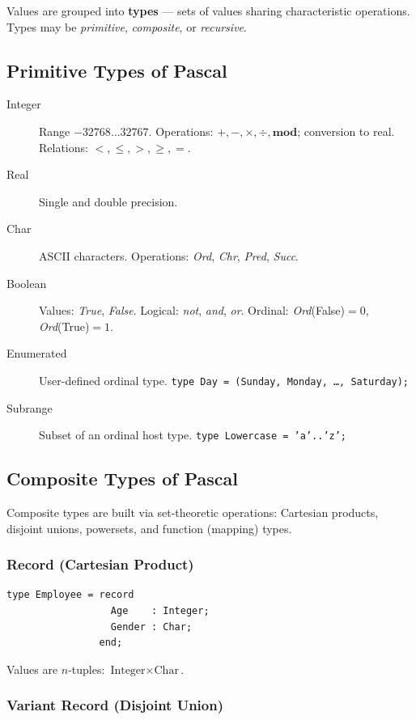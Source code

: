 \documentclass[12pt,a4paper]{article}
\begin{document}
Values are grouped into \textbf{types} — sets of values sharing characteristic operations.
Types may be \emph{primitive}, \emph{composite}, or \emph{recursive}.

\subsection{Primitive Types of Pascal}

\begin{description}
  \item[Integer] Range $-32768 \ldots 32767$.
        Operations: $+,-,\times,\div,\mathbf{mod}$; conversion to real.
        Relations: $<,\leq,>,\geq,=$.
  \item[Real] Single and double precision.
  \item[Char] ASCII characters. Operations: \textit{Ord}, \textit{Chr}, \textit{Pred}, \textit{Succ}.
  \item[Boolean] Values: \textit{True}, \textit{False}.
        Logical: \textit{not}, \textit{and}, \textit{or}.
        Ordinal: \textit{Ord}(False)$=0$, \textit{Ord}(True)$=1$.
  \item[Enumerated] User-defined ordinal type.
        \texttt{type Day = (Sunday, Monday, \ldots, Saturday);}
  \item[Subrange] Subset of an ordinal host type.
        \texttt{type Lowercase = 'a'..'z';}
\end{description}

\subsection{Composite Types of Pascal}

Composite types are built via set-theoretic operations:
Cartesian products, disjoint unions, powersets, and function (mapping) types.

\subsubsection{Record (Cartesian Product)}

\begin{lstlisting}[style=pascal,numbers=none]
type Employee = record
                  Age    : Integer;
                  Gender : Char;
                end;
\end{lstlisting}
Values are $n$-tuples: $\text{Integer} \times \text{Char}$.

\subsubsection{Variant Record (Disjoint Union)}
\end{document}
